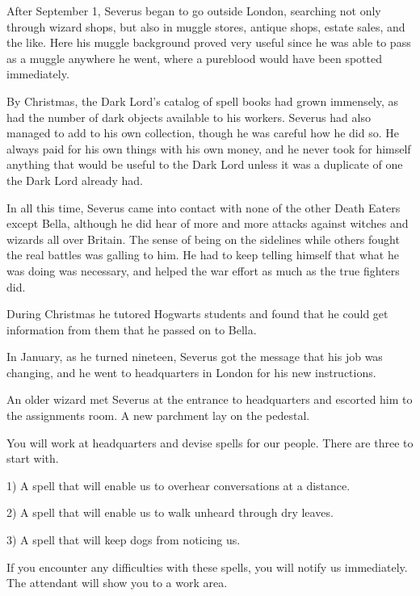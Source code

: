 After September 1, Severus began to go outside London, searching not only through wizard shops, but also in muggle stores, antique shops, estate sales, and the like. Here his muggle background proved very useful since he was able to pass as a muggle anywhere he went, where a pureblood would have been spotted immediately.

By Christmas, the Dark Lord's catalog of spell books had grown immensely, as had the number of dark objects available to his workers. Severus had also managed to add to his own collection, though he was careful how he did so. He always paid for his own things with his own money, and he never took for himself anything that would be useful to the Dark Lord unless it was a duplicate of one the Dark Lord already had.

In all this time, Severus came into contact with none of the other Death Eaters except Bella, although he did hear of more and more attacks against witches and wizards all over Britain. The sense of being on the sidelines while others fought the real battles was galling to him. He had to keep telling himself that what he was doing was necessary, and helped the war effort as much as the true fighters did.

During Christmas he tutored Hogwarts students and found that he could get information from them that he passed on to Bella.

In January, as he turned nineteen, Severus got the message that his job was changing, and he went to headquarters in London for his new instructions.

An older wizard met Severus at the entrance to headquarters and escorted him to the assignments room. A new parchment lay on the pedestal.

\begin{writtenNote}

You will work at headquarters and devise spells for our people. There are three to start with.

1) A spell that will enable us to overhear conversations at a distance.

2) A spell that will enable us to walk unheard through dry leaves.

3) A spell that will keep dogs from noticing us.

If you encounter any difficulties with these spells, you will notify us immediately. The attendant will show you to a work area.

\end{writtenNote}

